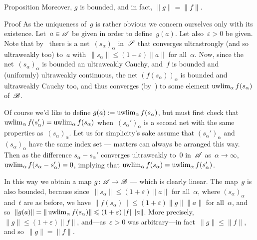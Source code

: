 \documentclass[a]{subfiles}
\begin{document}
\begin{parsec}
\begin{point}[vn-extension]{Proposition}
Moreover, $g$ is bounded,
and in fact,  $\|g\|=\|f\|$.
\begin{point}{Proof}%
As the uniqueness of~$g$ is rather obvious
we concern ourselves only with its existence.
Let~$a\in\mathscr{A}$ be given
in order to define~$g(a)$.
Let also~$\varepsilon>0$ be given.
Note that by~ 
there is a net~$(s_\alpha)_\alpha$
in~$\mathscr{S}$
that converges ultrastrongly (and so ultraweakly too)
to~$a$
with~$\|s_\alpha \|\leq(1+\varepsilon)\|a\|$
for all~$\alpha$.
Now,
since the net~$(s_\alpha)_\alpha$
is bounded an ultraweakly Cauchy,
and~$f$ is bounded and (uniformly) ultraweakly continuous,
the net
$(f(s_\alpha))_\alpha$
is bounded and ultraweakly Cauchy too,
and thus converges (by~)
to some element
$\uwlim_\alpha f(s_\alpha)$
of~$\mathscr{B}$.

\begin{point}%
Of course we'd like to define $g(a):=\uwlim_\alpha
f(s_\alpha)$,
but must first check
that $\uwlim_\alpha f(s_\alpha')
=\uwlim_\alpha f(s_\alpha)$
when~$(s_\alpha')_\alpha$ is a second net with the same properties
as~$(s_\alpha)_\alpha$.
Let us for simplicity's sake
assume that $(s_\alpha')_\alpha$ and~$(s_\alpha)_\alpha$
have the same index set
--- matters can always be arranged this way.
Then as the difference $s_\alpha-s_\alpha'$
converges ultraweakly to~$0$ in~$\mathscr{A}$ as~$\alpha\to\infty$,
$\uwlim_\alpha f(s_\alpha-s_\alpha')=0$,
implying that $\uwlim_\alpha f(s_\alpha)
= \uwlim_\alpha f(s_\alpha')$.
\end{point}
\begin{point}%
In this way
we obtain a map $g \colon \mathscr{A}\to\mathscr{B}$
--- which is clearly linear.
The map~$g$ is also bounded,
because since~$\|s_\alpha\|\leq (1+\varepsilon)\|a\|$
for all~$\alpha$,
where $(s_\alpha)_\alpha$ and~$t$ are as before,
we have $\|f (s_\alpha)\|\leq (1+\varepsilon) \|g\|\|a\|$
for all~$\alpha$,
and so~$\|g(a)\|=\|\uwlim_\alpha f(s_\alpha)\|
\leq (1+\varepsilon) \|f \|\|a\|$.
More precisely, $\|g\|\leq (1+\varepsilon)\|f\|$,
and---as~$\varepsilon>0$ was arbitrary---in 
fact~$\|g\|\leq \|f\|$, and so~$\|g\|=\|f\|$.


\end{point}
\end{point}
\end{point}
\end{parsec}
\end{document}
